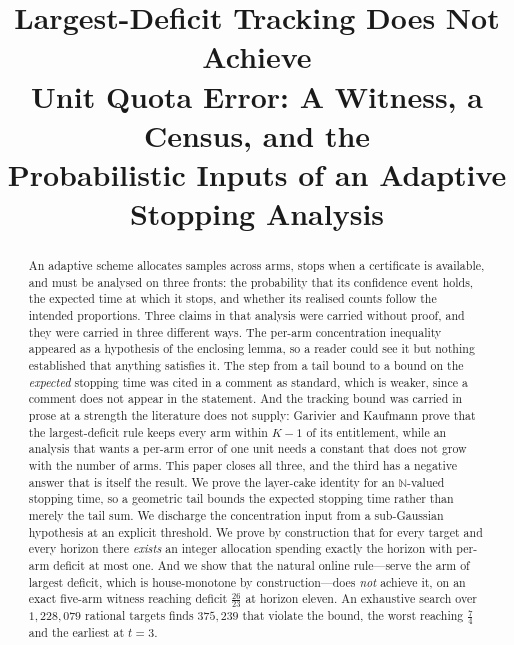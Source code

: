 \documentclass[conference]{IEEEtran}
\theoremstyle{definition}
\begin{document}
\title{Largest-Deficit Tracking Does Not Achieve\\
Unit Quota Error: A Witness, a Census, and the\\
Probabilistic Inputs of an Adaptive Stopping Analysis}

\author{
}

\maketitle

\begin{abstract}
An adaptive scheme allocates samples across arms, stops when a certificate is available, and
must be analysed on three fronts: the probability that its confidence event holds, the
expected time at which it stops, and whether its realised counts follow the intended
proportions. Three claims in that analysis were carried without proof, and they were carried
in three different ways. The per-arm concentration inequality appeared as a hypothesis of the
enclosing lemma, so a reader could see it but nothing established that anything satisfies it.
The step from a tail bound to a bound on the \emph{expected} stopping time was cited in a
comment as standard, which is weaker, since a comment does not appear in the statement. And
the tracking bound was carried in prose at a strength the literature does not supply:
Garivier and Kaufmann prove that the largest-deficit rule keeps every arm within $K-1$ of its
entitlement, while an analysis that wants a per-arm error of one unit needs a constant that
does not grow with the number of arms. This paper closes all three, and the third has a
negative answer that is itself the result. We prove the layer-cake identity for an $\mathbb{N}$-valued stopping time, so a
geometric tail bounds the expected stopping time rather than merely the tail sum. We discharge
the concentration input from a sub-Gaussian hypothesis at an explicit threshold. We prove by
construction that for every target and every horizon there \emph{exists} an integer allocation
spending exactly the horizon with per-arm deficit at most one. And we show that the natural
online rule---serve the arm of largest deficit, which is house-monotone by construction---does
\emph{not} achieve it, on an exact five-arm witness reaching deficit $\tfrac{26}{23}$ at
horizon eleven. An exhaustive search over $1{,}228{,}079$ rational targets finds
$375{,}239$ that violate the bound, the worst reaching $\tfrac74$ and the earliest at $t=3$.

\end{abstract}
\end{document}
